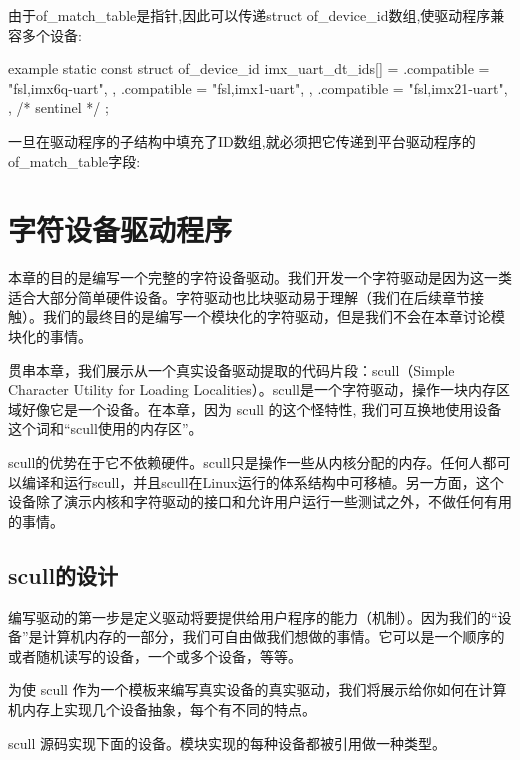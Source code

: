 \documentclass[lang=cn,newtx,10pt,scheme=chinese]{elegantbook}
\begin{document}
由于of\_match\_table是指针,因此可以传递struct of\_device\_id数组,使驱动程序兼容多个设备:

\begin{mycode}{example}
static const struct of_device_id imx_uart_dt_ids[] = {
    { .compatible = "fsl,imx6q-uart", },
    { .compatible = "fsl,imx1-uart", },
    { .compatible = "fsl,imx21-uart", },
    { /* sentinel */ }
};
\end{mycode}

一旦在驱动程序的子结构中填充了ID数组,就必须把它传递到平台驱动程序的of\_match\_table字段:

\chapter{字符设备驱动程序}

本章的目的是编写一个完整的字符设备驱动。我们开发一个字符驱动是因为这一类适合大部分简单硬件设备。字符驱动也比块驱动易于理解（我们在后续章节接触）。我们的最终目的是编写一个模块化的字符驱动，但是我们不会在本章讨论模块化的事情。

贯串本章，我们展示从一个真实设备驱动提取的代码片段：scull（Simple Character Utility for Loading Localities）。scull是一个字符驱动，操作一块内存区域好像它是一个设备。在本章，因为 scull 的这个怪特性, 我们可互换地使用设备这个词和``scull使用的内存区''。

scull的优势在于它不依赖硬件。scull只是操作一些从内核分配的内存。任何人都可以编译和运行scull，并且scull在Linux运行的体系结构中可移植。另一方面，这个设备除了演示内核和字符驱动的接口和允许用户运行一些测试之外，不做任何有用的事情。

\section{scull的设计}

编写驱动的第一步是定义驱动将要提供给用户程序的能力（机制）。因为我们的``设备''是计算机内存的一部分，我们可自由做我们想做的事情。它可以是一个顺序的或者随机读写的设备，一个或多个设备，等等。

为使 scull 作为一个模板来编写真实设备的真实驱动，我们将展示给你如何在计算机内存上实现几个设备抽象，每个有不同的特点。

scull 源码实现下面的设备。模块实现的每种设备都被引用做一种类型。
\end{document}

